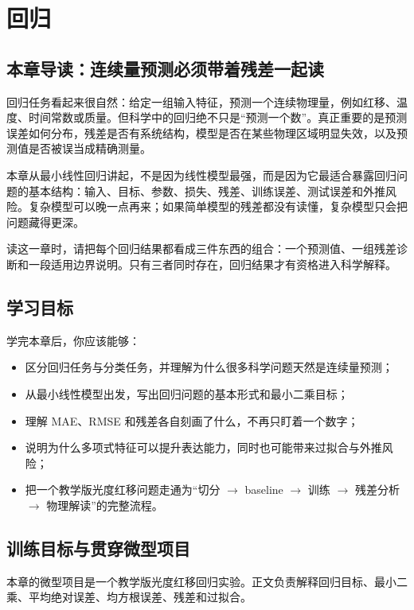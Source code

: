 \chapter{回归}

\section{本章导读：连续量预测必须带着残差一起读}

回归任务看起来很自然：给定一组输入特征，预测一个连续物理量，例如红移、温度、时间常数或质量。但科学中的回归绝不只是“预测一个数”。真正重要的是预测误差如何分布，残差是否有系统结构，模型是否在某些物理区域明显失效，以及预测值是否被误当成精确测量。

本章从最小线性回归讲起，不是因为线性模型最强，而是因为它最适合暴露回归问题的基本结构：输入、目标、参数、损失、残差、训练误差、测试误差和外推风险。复杂模型可以晚一点再来；如果简单模型的残差都没有读懂，复杂模型只会把问题藏得更深。

读这一章时，请把每个回归结果都看成三件东西的组合：一个预测值、一组残差诊断和一段适用边界说明。只有三者同时存在，回归结果才有资格进入科学解释。

\section{学习目标}

学完本章后，你应该能够：

\begin{itemize}
    \item 区分回归任务与分类任务，并理解为什么很多科学问题天然是连续量预测；
    \item 从最小线性模型出发，写出回归问题的基本形式和最小二乘目标；
    \item 理解 MAE、RMSE 和残差各自刻画了什么，不再只盯着一个数字；
    \item 说明为什么多项式特征可以提升表达能力，同时也可能带来过拟合与外推风险；
    \item 把一个教学版光度红移问题走通为“切分 $\rightarrow$ baseline $\rightarrow$ 训练 $\rightarrow$ 残差分析 $\rightarrow$ 物理解读”的完整流程。
\end{itemize}

\section{训练目标与贯穿微型项目}

本章的微型项目是一个教学版光度红移回归实验。正文负责解释回归目标、最小二乘、平均绝对误差、均方根误差、残差和过拟合。

